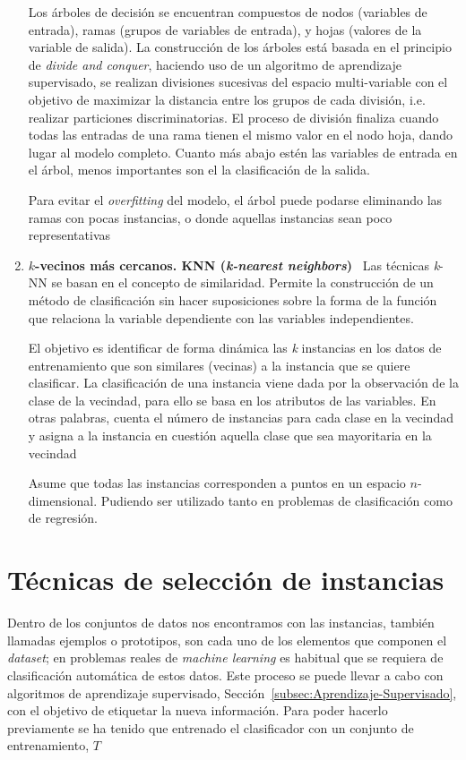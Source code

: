 \begin{enumerate}
	Los árboles de decisión se encuentran compuestos de nodos (variables de entrada), ramas (grupos de variables de entrada), y hojas (valores de la variable de salida). La construcción de los árboles está basada en el principio de \textit{divide and conquer}, haciendo uso de un algoritmo de aprendizaje supervisado, se realizan divisiones sucesivas del espacio multi-variable con el objetivo de maximizar la distancia entre los grupos de cada división, i.e. realizar particiones discriminatorias. El proceso de división finaliza cuando todas las entradas de una rama tienen el mismo valor en el nodo hoja, dando lugar al modelo completo. Cuanto más abajo estén las variables de entrada en el árbol, menos importantes son el la clasificación  de la salida.
	
	Para evitar el \textit{overfitting} del modelo, el árbol puede podarse eliminando las ramas con pocas instancias, o donde aquellas instancias sean poco representativas~\cite{palmer2011data}
	
	\item \textbf{$k$-vecinos más cercanos. KNN (\textit{k-nearest neighbors})}~\cite{guo2003knn,hand2007principles,palmer2011data} Las técnicas \textit{k}-NN se basan en el concepto de similaridad. Permite la construcción de un método de clasificación sin hacer suposiciones sobre la forma de la función que relaciona la variable dependiente con las variables independientes.
	
	El objetivo es identificar de forma dinámica las \textit{k} instancias en los datos de entrenamiento que son similares (vecinas) a la instancia que se quiere clasificar. La clasificación de una instancia viene dada por la observación de la clase de la vecindad, para ello se basa en los atributos de las variables. En otras palabras, cuenta el número de instancias para cada clase en la vecindad y asigna a la instancia en cuestión aquella clase que sea mayoritaria en la vecindad~\cite{potomac1999introduction}
	
	Asume que todas las instancias corresponden a puntos en un espacio $n$-dimensional. Pudiendo ser utilizado tanto en problemas de clasificación como de regresión.
\end{enumerate}

\section{Técnicas de selección de instancias}\label{sec:tecnicas-seleccion-instancias}
Dentro de los conjuntos de datos nos encontramos con las instancias, también llamadas ejemplos o prototipos, son cada uno de los elementos que componen el \textit{dataset}; en problemas reales de \textit{machine learning} es habitual que se requiera de clasificación automática de estos datos. Este proceso se puede llevar a cabo con algoritmos de aprendizaje supervisado, Sección~\ref{subsec:Aprendizaje-Supervisado}, con el objetivo de etiquetar la nueva información. Para poder hacerlo previamente se ha tenido que entrenado el clasificador con un conjunto de entrenamiento, $T$~\cite{olvera2010review}

